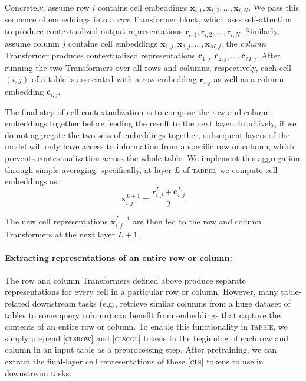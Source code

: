 \documentclass[11pt]{article}
\newcommand{\bvec}[1]{\boldsymbol{#1}}
\newcommand{\name}[0]{\textsc{tabbie}}
\begin{document}
Concretely, assume row $i$ contains cell embeddings $\bvec{x}_{i,1}, \bvec{x}_{i,2}, \dots, \bvec{x}_{i,N}$. We pass this sequence of embeddings into a \emph{row} Transformer block, which uses self-attention to produce contextualized output representations $\bvec{r}_{i,1}, \bvec{r}_{i,2}, \dots, \bvec{r}_{i,N}$. Similarly, assume column $j$ contains cell embeddings $\bvec{x}_{1,j}, \bvec{x}_{2,j}, \dots, \bvec{x}_{M,j}$; the \emph{column} Transformer produces contextualized representations $\bvec{c}_{1,j}, \bvec{c}_{2,j}, \dots, \bvec{c}_{M,j}$. After running the two Transformers over all rows and columns, respectively, each cell $(i, j)$ of a table is associated with a row embedding $\bvec{r}_{i,j}$ as well as a column embedding $\bvec{c}_{i,j}$. 

The final step of cell contextualization is to compose the row and column embeddings together before feeding the result to the next layer. Intuitively, if we do not aggregate the two sets of embeddings together, subsequent layers of the model will only have access to information from a specific row or column, which prevents contextualization across the whole table. We implement this aggregation through simple averaging: specifically, at layer $L$ of \name, we compute cell embeddings as:
\begin{equation}
    \bvec{x}^{L+1}_{i,j} = \frac{\bvec{r}^L_{i,j} + \bvec{c}^L_{i,j}}{2}
\end{equation}

The new cell representations $\bvec{x}^{L+1}_{i,j}$ are then fed to the row and column Transformers at the next layer $L+1$. 

\paragraph{Extracting representations of an entire row or column:}
The row and column Transformers defined above produce separate representations for every cell in a particular row or column. However, many table-related downstream tasks (e.g., retrieve similar columns from a huge dataset of tables to some query column) can benefit from embeddings that capture the contents of an entire row or column. To enable this functionality in \name, we simply prepend \textsc{[clsrow]} and \textsc{[clscol]} tokens to the beginning of each row and column in an input table as a preprocessing step. After pretraining, we can extract the final-layer cell representations of these  \textsc{[cls]} tokens to use in downstream tasks. 
\end{document}

